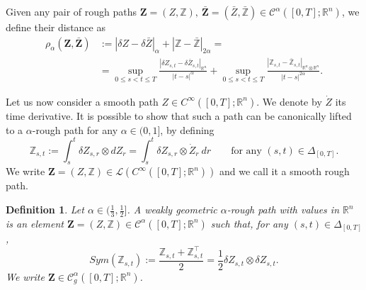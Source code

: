 \documentclass[11pt,a4paper]{article}
\newcommand{\R}{\mathbb{R}}
\newtheorem{defn}{Definition}[section]
\theoremstyle{plain}
\begin{document}
Given any pair of rough paths $\mathbf{Z}=(Z,\mathbb{Z}), \ \bar{\mathbf{Z}}=(\bar{Z},\bar{\mathbb{Z}}) \in \mathscr{C}^\alpha([0,T];\R^n)$,  we define their distance as \begin{equation*} \begin{aligned}
    \rho_{\alpha}(\mathbf{Z},\bar{\mathbf{Z}}) &:= |\delta Z -\delta\bar{Z}|_\alpha + |\mathbb{Z}-\bar{\mathbb{Z}}|_{2\alpha} =  \\ &= \sup_{0\le s<t\le T} \frac{|\delta Z_{s,t} - \delta \bar{Z}_{s,t}|_{\R^n}}{|t-s|^\alpha} + \sup_{0\le s<t\le T} \frac{|\mathbb{Z}_{s,t} -  \bar{\mathbb{Z}}_{s,t}|_{\R^n \otimes \R^n}}{|t-s|^{2\alpha}} .
\end{aligned}
\end{equation*} 


Let us now consider a smooth path $Z \in {C}^\infty([0,T];\R^n)$. We denote by $\dot{Z}$ its time derivative. It is possible to show that such a path can be canonically lifted to a $\alpha$-rough path for any $\alpha \in (0,1]$, by defining  
\begin{equation*}
    \mathbb{Z}_{s,t} := \int_s^t \delta Z_{s,r} \otimes dZ_r = \int_s^t \delta Z_{s,r} \otimes \dot{Z}_r \ dr \qquad \text{for any $(s,t)\in\Delta_{[0,T]}$}.
\end{equation*}
We write $\mathbf{Z}=(Z,\mathbb{Z}) \in \mathscr{L}({C}^\infty([0,T];\R^n))$ and we call it a smooth rough path. 

\begin{defn} Let $\alpha \in (\frac13,\frac12]$. A weakly geometric $\alpha$-rough path with values in $\R^n$ is an element  $\mathbf{Z}=(Z,\mathbb{Z}) \in \mathscr{C}^\alpha([0,T];\R^n)$ such that, for any $(s,t) \in \Delta_{[0,T]}$, \begin{equation*}
Sym(\mathbb{Z}_{s,t}):=\frac{\mathbb{Z}_{s,t}+\mathbb{Z}_{s,t}^\top}{2} = \frac{1}{2}\delta Z_{s,t} \otimes \delta Z_{s,t}.
\end{equation*}
We write $\mathbf{Z}\in \mathscr{C}^\alpha_g([0,T];\R^n)$.
\end{defn}

\end{document}
